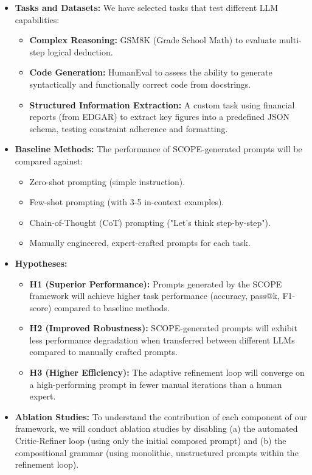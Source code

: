 \documentclass{article}
\begin{document}
\begin{itemize}
    \item \textbf{Tasks and Datasets:} We have selected tasks that test different LLM capabilities:
    \begin{itemize}
        \item \textbf{Complex Reasoning:} GSM8K (Grade School Math) to evaluate multi-step logical deduction.
        \item \textbf{Code Generation:} HumanEval to assess the ability to generate syntactically and functionally correct code from docstrings.
        \item \textbf{Structured Information Extraction:} A custom task using financial reports (from EDGAR) to extract key figures into a predefined JSON schema, testing constraint adherence and formatting.
    \end{itemize}

    \item \textbf{Baseline Methods:} The performance of SCOPE-generated prompts will be compared against:
    \begin{itemize}
        \item Zero-shot prompting (simple instruction).
        \item Few-shot prompting (with 3-5 in-context examples).
        \item Chain-of-Thought (CoT) prompting ("Let's think step-by-step").
        \item Manually engineered, expert-crafted prompts for each task.
    \end{itemize}

    \item \textbf{Hypotheses:}
    \begin{itemize}
        \item \textbf{H1 (Superior Performance):} Prompts generated by the SCOPE framework will achieve higher task performance (accuracy, pass@k, F1-score) compared to baseline methods.
        \item \textbf{H2 (Improved Robustness):} SCOPE-generated prompts will exhibit less performance degradation when transferred between different LLMs compared to manually crafted prompts.
        \item \textbf{H3 (Higher Efficiency):} The adaptive refinement loop will converge on a high-performing prompt in fewer manual iterations than a human expert.
    \end{itemize}

    \item \textbf{Ablation Studies:} To understand the contribution of each component of our framework, we will conduct ablation studies by disabling (a) the automated Critic-Refiner loop (using only the initial composed prompt) and (b) the compositional grammar (using monolithic, unstructured prompts within the refinement loop).
\end{itemize}
\end{document}
